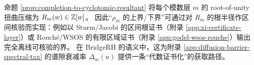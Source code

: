\begin{remark}\label{rem:resultant-to-interval-audit}
命题 \ref{prop:completion-to-cyclotomic-resultant} 将每个模数层 \(m\) 的 root-of-unity 扭曲压缩为 \(R_m(w)\in\mathbb{Z}[w]\)。
因此“\(\rho_m\) 的上界/下界”可通过对 \(R_m\) 的根半径作区间核验而实现：例如以 Sturm/Jacobi 的区间根证书（附录 \ref{app:xi-certificate-layer}）或 Rouch{\'e}/WSOS 的有限区域证书（附录 \ref{app:godel-wsos-rouche}）输出完全离线可核验的界。
在 BridgeRH 的语义中，这为附录 \ref{app:diffusion-barrier-spectral-tax} 的谱隙衰减率 \(\Delta_m(u)\) 提供一条“代数证书化”的获取路径。
\end{remark}

